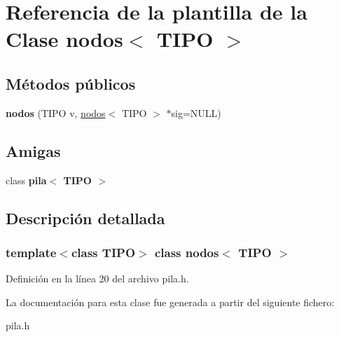 \hypertarget{classnodos}{}\section{Referencia de la plantilla de la Clase nodos$<$ T\+I\+PO $>$}
\label{classnodos}
\subsection*{Métodos públicos}
\begin{DoxyCompactItemize}
\item 
\mbox{\label{classnodos_a4d88f9a2052b194e9ef686407967c254}} 
{\bfseries nodos} (T\+I\+PO v, \hyperlink{classnodos}{nodos}$<$ T\+I\+PO $>$ $\ast$sig=N\+U\+LL)
\end{DoxyCompactItemize}
\subsection*{Amigas}
\begin{DoxyCompactItemize}
\item 
\mbox{\label{classnodos_ac3309a881bf39610f0c7d0dbb63fbcce}} 
class {\bfseries pila$<$ T\+I\+P\+O $>$}
\end{DoxyCompactItemize}


\subsection{Descripción detallada}
\subsubsection*{template$<$class T\+I\+PO$>$\newline
class nodos$<$ T\+I\+P\+O $>$}



Definición en la línea 20 del archivo pila.\+h.



La documentación para esta clase fue generada a partir del siguiente fichero\+:\begin{DoxyCompactItemize}
\item 
pila.\+h\end{DoxyCompactItemize}
